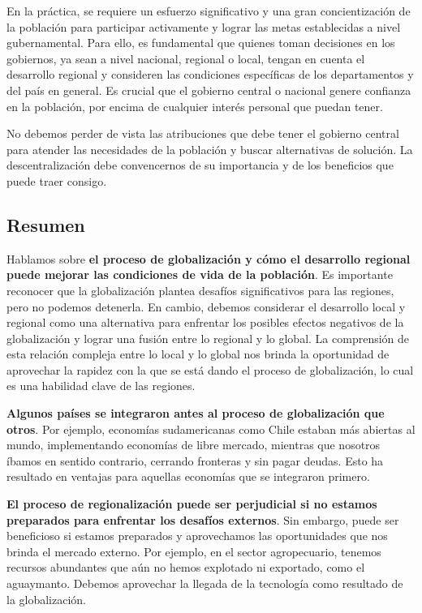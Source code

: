 \documentclass[
  a4paper,
]{article}
\begin{document}
En la práctica, se requiere un esfuerzo significativo y una gran
concientización de la población para participar activamente y lograr las
metas establecidas a nivel gubernamental. Para ello, es fundamental que
quienes toman decisiones en los gobiernos, ya sean a nivel nacional,
regional o local, tengan en cuenta el desarrollo regional y consideren
las condiciones específicas de los departamentos y del país en general.
Es crucial que el gobierno central o nacional genere confianza en la
población, por encima de cualquier interés personal que puedan tener.

No debemos perder de vista las atribuciones que debe tener el gobierno
central para atender las necesidades de la población y buscar
alternativas de solución. La descentralización debe convencernos de su
importancia y de los beneficios que puede traer consigo.

\subsection{Resumen}\label{resumen}

Hablamos sobre \textbf{el proceso de globalización y cómo el desarrollo
regional puede mejorar las condiciones de vida de la población}. Es
importante reconocer que la globalización plantea desafíos
significativos para las regiones, pero no podemos detenerla. En cambio,
debemos considerar el desarrollo local y regional como una alternativa
para enfrentar los posibles efectos negativos de la globalización y
lograr una fusión entre lo regional y lo global. La comprensión de esta
relación compleja entre lo local y lo global nos brinda la oportunidad
de aprovechar la rapidez con la que se está dando el proceso de
globalización, lo cual es una habilidad clave de las regiones.

\textbf{Algunos países se integraron antes al proceso de globalización
que otros}. Por ejemplo, economías sudamericanas como Chile estaban más
abiertas al mundo, implementando economías de libre mercado, mientras
que nosotros íbamos en sentido contrario, cerrando fronteras y sin pagar
deudas. Esto ha resultado en ventajas para aquellas economías que se
integraron primero.

\textbf{El proceso de regionalización puede ser perjudicial si no
estamos preparados para enfrentar los desafíos externos}. Sin embargo,
puede ser beneficioso si estamos preparados y aprovechamos las
oportunidades que nos brinda el mercado externo. Por ejemplo, en el
sector agropecuario, tenemos recursos abundantes que aún no hemos
explotado ni exportado, como el aguaymanto. Debemos aprovechar la
llegada de la tecnología como resultado de la globalización.
\end{document}
